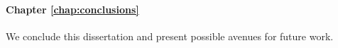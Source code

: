 \paragraph{Chapter \ref{chap:conclusions}} We conclude this dissertation and present possible avenues for future work.


